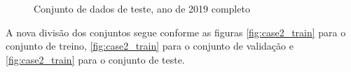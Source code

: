 \documentclass[	12pt, Times, openright, twoside, a4paper, english, brazil]{abntex2}
\begin{document}
                \begin{figure}[!ht]
                  \caption{Conjunto de dados de teste, ano de 2019 completo \label{fig:case2_test} }
                \end{figure}
    	        
    	        A nova divisão dos conjuntos segue conforme as figuras \ref{fig:case2_train} para o conjunto de treino, \ref{fig:case2_train} para o conjunto de validação e \ref{fig:case2_train} para o conjunto de teste.
    	        
\end{document}

